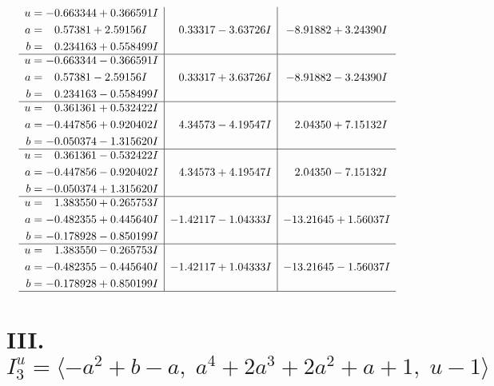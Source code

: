 \documentclass[1p]{elsarticle_modified}
\theoremstyle{definition}
\begin{document}
$$\begin{array}{c|c|c}
\begin{aligned}
u &= -0.663344 + 0.366591 I \\
a &= \phantom{-}0.57381 + 2.59156 I \\
b &= \phantom{-}0.234163 + 0.558499 I\end{aligned}
 & \phantom{-}0.33317 - 3.63726 I & -8.91882 + 3.24390 I \\ \hline\begin{aligned}
u &= -0.663344 - 0.366591 I \\
a &= \phantom{-}0.57381 - 2.59156 I \\
b &= \phantom{-}0.234163 - 0.558499 I\end{aligned}
 & \phantom{-}0.33317 + 3.63726 I & -8.91882 - 3.24390 I \\ \hline\begin{aligned}
u &= \phantom{-}0.361361 + 0.532422 I \\
a &= -0.447856 + 0.920402 I \\
b &= -0.050374 - 1.315620 I\end{aligned}
 & \phantom{-}4.34573 - 4.19547 I & \phantom{-}2.04350 + 7.15132 I \\ \hline\begin{aligned}
u &= \phantom{-}0.361361 - 0.532422 I \\
a &= -0.447856 - 0.920402 I \\
b &= -0.050374 + 1.315620 I\end{aligned}
 & \phantom{-}4.34573 + 4.19547 I & \phantom{-}2.04350 - 7.15132 I \\ \hline\begin{aligned}
u &= \phantom{-}1.383550 + 0.265753 I \\
a &= -0.482355 + 0.445640 I \\
b &= -0.178928 - 0.850199 I\end{aligned}
 & -1.42117 - 1.04333 I & -13.21645 + 1.56037 I \\ \hline\begin{aligned}
u &= \phantom{-}1.383550 - 0.265753 I \\
a &= -0.482355 - 0.445640 I \\
b &= -0.178928 + 0.850199 I\end{aligned}
 & -1.42117 + 1.04333 I & -13.21645 - 1.56037 I\\
 \hline 
 \end{array}$$\newpage\newpage\renewcommand{\arraystretch}{1}
\centering \section*{III. $I^u_{3}= \langle - a^2+b- a,\;a^4+2 a^3+2 a^2+a+1,\;u-1 \rangle$}
\end{document}
